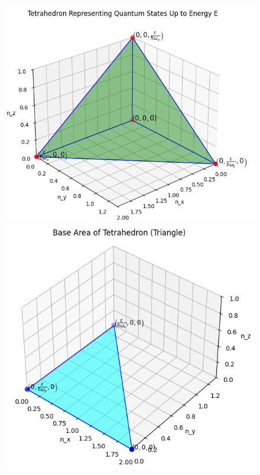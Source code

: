 \documentclass{article}
\numberwithin{equation}{section}
\numberwithin{equation}{subsection}
\begin{document}
\begin{figure}[h!]
    \centering
    \begin{minipage}{0.55\textwidth}
        \centering
        \includegraphics[width=\textwidth]{Figure_1.png}
    \end{minipage}\hfill
    \begin{minipage}{0.45\textwidth}
        \centering
        \includegraphics[width=\textwidth]{Figure_2.png}
    \end{minipage}
\end{figure}
\end{document}
